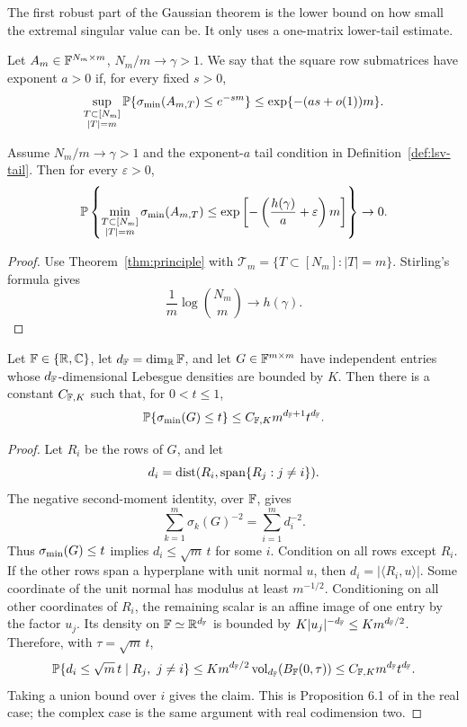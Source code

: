 The first robust part of the Gaussian theorem is the lower bound on how small
the extremal singular value can be.  It only uses a one-matrix lower-tail
estimate.

\begin{definition}\label{def:lsv-tail}
Let \(A_m\in\mathbb{F}^{N_m\times m}\), \(N_m/m\to\gamma>1\).  We say that the square
row submatrices have exponent \(a>0\) if, for every fixed \(s>0\),
\[
  \sup_{\substack{T\subset[N_m]\\ |T|=m}}
  \mathbb{P}\{\sigma_{\min}(A_{m,T})\le e^{-sm}\}
  \le \exp\{-(as+o(1))m\}.
\]
\end{definition}

\begin{theorem}\label{thm:univ-lower}
Assume \(N_m/m\to\gamma>1\) and the exponent-\(a\) tail condition in
Definition~\ref{def:lsv-tail}.  Then for every \(\varepsilon>0\),
\[
  \mathbb{P}\left\{
  \min_{\substack{T\subset[N_m]\\ |T|=m}}\sigma_{\min}(A_{m,T})
  \le \exp\left[-\left(\frac{h(\gamma)}{a}+\varepsilon\right)m\right]
  \right\}\to0.
\]
\end{theorem}

\begin{proof}
Use Theorem~\ref{thm:principle} with
\(\mathcal T_m=\{T\subset[N_m]: |T|=m\}\).  Stirling's formula gives
\[
  \frac{1}{m}\log \binom{N_m}{m}\to h(\gamma).
\]
\end{proof}

\begin{proposition}\label{prop:bd-tail}
Let \(\mathbb{F}\in\{\mathbb{R},\mathbb{C}\}\), let \(d_{\mathbb{F}}=\dim_{\mathbb{R}}\mathbb{F}\), and let
\(G\in\mathbb{F}^{m\times m}\) have independent entries whose \(d_{\mathbb{F}}\)-dimensional
Lebesgue densities are bounded by \(K\).  Then there is a constant
\(C_{\mathbb{F},K}\) such that, for \(0<t\le1\),
\[
  \mathbb{P}\{\sigma_{\min}(G)\le t\}\le C_{\mathbb{F},K}m^{d_{\mathbb{F}}+1}t^{d_{\mathbb{F}}}.
\]
\end{proposition}

\begin{proof}
Let \(R_i\) be the rows of \(G\), and let
\[
  d_i=\operatorname{dist}(R_i,\operatorname{span}\{R_j:j\ne i\}).
\]
The negative second-moment identity, over \(\mathbb{F}\), gives
\[
  \sum_{k=1}^m \sigma_k(G)^{-2}=\sum_{i=1}^m d_i^{-2}.
\]
Thus \(\sigma_{\min}(G)\le t\) implies \(d_i\le \sqrt m\,t\) for some \(i\).
Condition on all rows except \(R_i\).  If the other rows span a hyperplane with
unit normal \(u\), then \(d_i=|\langle R_i,u\rangle|\).  Some coordinate of
the unit normal has modulus at least \(m^{-1/2}\).  Conditioning on all other
coordinates of \(R_i\), the remaining scalar is an affine image of one entry by
the factor \(u_j\).  Its density on \(\mathbb{F}\simeq\mathbb{R}^{d_{\mathbb{F}}}\) is bounded by
\(K|u_j|^{-d_{\mathbb{F}}}\le K m^{d_{\mathbb{F}}/2}\).  Therefore, with
\(\tau=\sqrt m\,t\),
\[
  \mathbb{P}\{d_i\le \sqrt m\,t\mid R_j,\ j\ne i\}
  \le K m^{d_{\mathbb{F}}/2}\operatorname{vol}_{d_{\mathbb{F}}}(B_{\mathbb{F}}(0,\tau))
  \le C_{\mathbb{F},K}m^{d_{\mathbb{F}}}t^{d_{\mathbb{F}}}.
\]
Taking a union bound over \(i\) gives the claim.  This is Proposition 6.1 of
\cite{ShmaloExtremal2026} in the real case; the complex case is the same
argument with real codimension two.
\end{proof}

